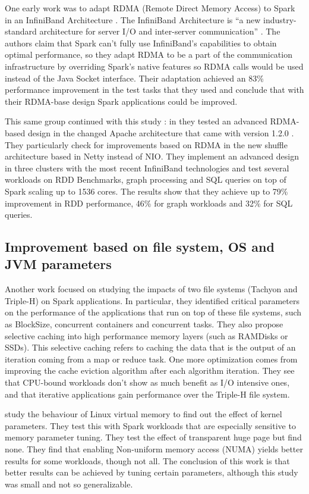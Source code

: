 \documentclass{article}
\begin{document}
One early work was to adapt RDMA (Remote Direct Memory Access) to Spark in an InfiniBand Architecture \cite{Lu2014}. The InfiniBand Architecture is ``a new industry-standard architecture for server I/O and inter-server communication'' \cite{pfister2001introduction}. The authors claim that Spark can't fully use InfiniBand's capabilities to obtain optimal performance, so they adapt RDMA to be a part of the communication infrastructure by overriding Spark's native features so RDMA calls would be used instead of the Java Socket interface. Their adaptation achieved an 83\% performance improvement in the test tasks that they used and conclude that with their RDMA-base design Spark applications could be improved.

This same group continued with this study \cite{Lu2016}: in \citeyear{Lu2016} they tested an advanced RDMA-based design in the changed Apache architecture that came with version 1.2.0 \cite{Armbrust2015}. They particularly check for improvements based on RDMA in the new shuffle architecture based in Netty instead of NIO. They implement an advanced design in three clusters with the most recent InfiniBand technologies and test several workloads on RDD Benchmarks, graph processing and SQL queries on top of Spark scaling up to 1536 cores. The results show that they achieve up to 79\% improvement in RDD performance, 46\% for graph workloads and 32\% for SQL queries. 


\subsection{Improvement based on file system, OS and JVM parameters}

Another work \cite{Islam2015} focused on studying the impacts of two file systems (Tachyon and Triple-H) on Spark applications. In particular, they identified critical parameters on the performance of the applications that run on top of these file systems, such as BlockSize, concurrent containers and concurrent tasks. They also propose selective caching into high performance memory layers (such as RAMDisks or SSDs). This selective caching refers to caching the data that is the output of an iteration coming from a map or reduce task. One more optimization comes from improving the cache eviction algorithm after each algorithm iteration. They see that CPU-bound workloads don't show as much benefit as I/O intensive ones, and that iterative applications gain performance over the Triple-H file system.

\citeauthor{Wang2016} \cite{Wang2016} study the behaviour of Linux virtual memory to find out the effect of kernel parameters. They test this with Spark workloads that are especially sensitive to memory parameter tuning. They test the effect of transparent huge page but find none. They find that enabling Non-uniform memory access (NUMA) yields better results for some workloads, though not all. The conclusion of this work is that better results can be achieved by tuning certain parameters, although this study was small and not so generalizable.
\end{document}
